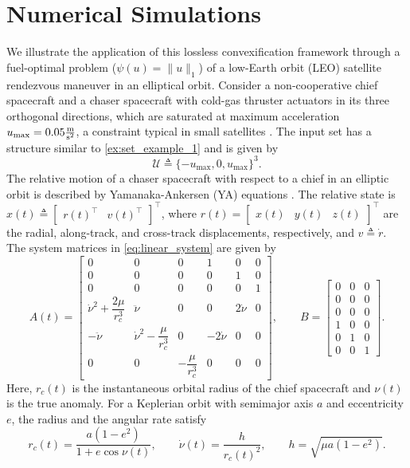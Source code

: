 \documentclass[conf]{new-aiaa}
\begin{document}
\section{Numerical Simulations}\label{sec:NumericalSim}

We illustrate the application of this lossless convexification framework through a fuel-optimal problem ($\psi(u) = \|u\|_1$) of a low-Earth orbit (LEO) satellite rendezvous maneuver in an elliptical orbit. Consider a non-cooperative chief spacecraft and a chaser spacecraft with cold-gas thruster actuators in its three orthogonal directions, which are saturated at maximum acceleration $u_{\max} = 0.05 \frac{\rm m}{\rm s^2}$, a constraint typical in small satellites \cite{weston_state---art_2025}. The input set has a structure similar to \cref{ex:set_example_1} and is given by
%
\begin{equation*}
    \mathcal{U} \triangleq \{-u_{\max},0,u_{\max}\}^3.
\end{equation*}
%
The relative motion of a chaser spacecraft with respect to a chief in an elliptic orbit is described by Yamanaka-Ankersen (YA) equations \cite{yamanaka_new_2002}. The relative state is $x(t) \triangleq \begin{bmatrix} r(t)^\top & v(t)^\top \end{bmatrix}^\top$, where $r(t) = \begin{bmatrix} x(t) & y(t) & z(t) \end{bmatrix}^\top$ are the radial, along-track, and cross-track displacements, respectively, and $v \triangleq \dot{r}$. The system matrices in \cref{eq:linear_system} are given by
%
\begin{equation*}
A(t) =
\begin{bmatrix}
0 & 0 & 0 & 1 & 0 & 0 \\
0 & 0 & 0 & 0 & 1 & 0 \\
0 & 0 & 0 & 0 & 0 & 1 \\
\dot{\nu}^2 + \dfrac{2\mu}{r_c^3} & \ddot{\nu} & 0 & 0 & 2\dot{\nu} & 0 \\
-\ddot{\nu} & \dot{\nu}^2 - \dfrac{\mu}{r_c^3} & 0 & -2\dot{\nu} & 0 & 0 \\
0 & 0 & -\dfrac{\mu}{r_c^3} & 0 & 0 & 0
\end{bmatrix},
\qquad
B =
\begin{bmatrix}
0 & 0 & 0 \\
0 & 0 & 0 \\
0 & 0 & 0 \\
1 & 0 & 0 \\
0 & 1 & 0 \\
0 & 0 & 1
\end{bmatrix}.
\end{equation*}
%
Here, $r_c(t)$ is the instantaneous orbital radius of the chief spacecraft and $\nu(t)$ is the true anomaly. For a Keplerian orbit with semimajor axis $a$ and eccentricity $e$, the radius and the angular rate satisfy
\begin{equation*}
    r_c(t) = \frac{a(1-e^2)}{1 + e\cos\nu(t)}, \qquad \dot{\nu}(t) = \frac{h}{r_c(t)^2}, 
    \qquad
    h = \sqrt{\mu a (1-e^2)}.
\end{equation*}
\end{document}

